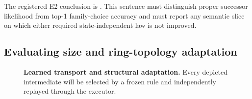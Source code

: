 The registered E2 conclusion is
. This sentence must distinguish proper
successor likelihood from top-1 family-choice accuracy and must report any
semantic slice on which either required state-independent law is not improved.

\subsection{Evaluating size and ring-topology adaptation}

\begin{figure}[htbp]
  \caption{\textbf{Learned transport and structural adaptation.} Every depicted
  intermediate will be selected by a frozen rule and independently replayed
  through the executor.}
  \label{fig:transport-adaptation}
\end{figure}

